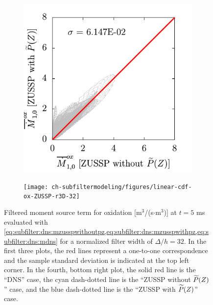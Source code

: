 \begin{figure}[ht]
\begin{subfigure}[b]{0.375\linewidth}
  \end{subfigure}
  \begin{subfigure}[b]{0.375\linewidth}
    \centering
    \includegraphics[width=\linewidth]{ch-subfiltermodeling/figures/lin-Mox4vsMox3-r3D-32}
  \end{subfigure}%
  \begin{subfigure}[b]{0.375\linewidth}
    \centering
    \texttt{[image: ch-subfiltermodeling/figures/linear-cdf-ox-ZUSSP-r3D-32]}
  \end{subfigure}
  \caption[Error Associated with \texorpdfstring{$\pz = \beta(Z;\tf{Z},\tf{Z_V})$}{P(Z) = B(Z;Z,ZV)} for \texorpdfstring{$\fst[M]{1,0}^{ox}$}{M1,0ox}]{Filtered moment source term for oxidation [m$^3$/(s$\cdot$m$^3$)] at $t = 5$ ms evaluated with \cref{eq:subfilter:dns:mzusspwithoutpz,eq:subfilter:dns:mzusspwithpz,eq:subfilter:dns:mdns} for a normalized filter width of $\Delta/h = 32$. In the first three plots, the red lines represent a one-to-one correspondence and the sample standard deviation is indicated at the top left corner. In the fourth, bottom right plot, the solid red line is the ``DNS'' case, the cyan dash-dotted line is the ``ZUSSP without $\widetilde{P}(Z)$'' case, and the blue dash-dotted line is the ``ZUSSP with $\widetilde{P}(Z)$'' case.}
  \label{fig:subfilter:dns:erroronbetaox}
\end{figure}

